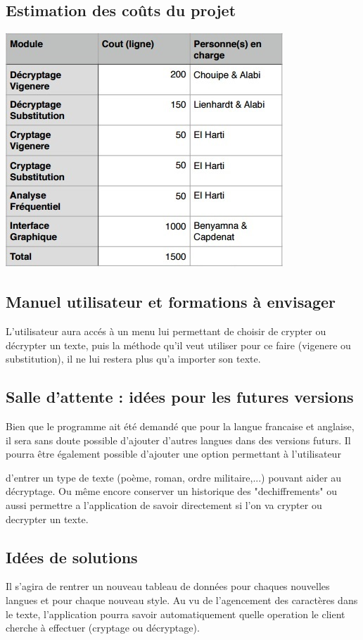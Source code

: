 \documentclass[a4]{article}
\begin{document}
		\subsection{Estimation des coûts du projet}
		\includegraphics[scale=0.5]{Tableau_cout.jpg} 
		\subsection{Manuel utilisateur et formations à envisager}
			L'utilisateur aura accés à un menu lui permettant de choisir de crypter ou décrypter un texte,
			puis la méthode qu'il veut utiliser pour ce faire (vigenere ou substitution), il ne lui restera 
			plus qu'a importer son texte.
		\subsection{Salle d’attente : idées pour les futures versions}
			Bien que le programme ait été demandé que pour la langue francaise et anglaise, 
			il sera sans doute possible d'ajouter d'autres langues dans des versions futurs. 
			Il pourra être également possible d'ajouter une option permettant à l'utilisateur

			d'entrer un type de texte (poème, roman, ordre militaire,...) pouvant aider au décryptage. Ou même encore conserver un historique des "dechiffrements" ou aussi permettre a l'application de savoir directement si l'on va crypter ou decrypter un texte.

		\subsection{Idées de solutions}
		 	Il s'agira de rentrer un nouveau tableau de données pour chaques nouvelles langues et pour chaque nouveau style.
			Au vu de l'agencement des caractères dans le texte, l'application pourra savoir automatiquement quelle operation le client cherche à effectuer (cryptage ou décryptage).
			
\end{document}
